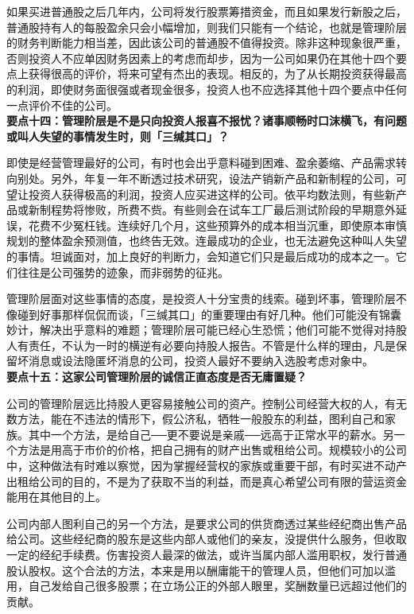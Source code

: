 \documentclass[UTF8,a4paper,zihao=-4,fontset = windows]{ctexart} %
\begin{document}
如果买进普通股之后几年内，公司将发行股票筹措资金，而且如果发行新股之后，普通股持有人的每股盈余只会小幅增加，则我们只能有一个结论，也就是管理阶层的财务判断能力相当差，因此该公司的普通股不值得投资。除非这种现象很严重，否则投资人不应单因财务因素上的考虑而却步，因为一公司如果仍在其他十四个要点上获得很高的评价，将来可望有杰出的表现。相反的，为了从长期投资获得最高的利润，即使财务面很强或者现金很多，投资人也不应选择其他十四个要点中任何一点评价不佳的公司。
\\

\textbf{要点十四：管理阶层是不是只向投资人报喜不报忧？诸事顺畅时口沫横飞，有问题或叫人失望的事情发生时，则「三缄其口」？}


即使是经营管理最好的公司，有时也会出乎意料碰到困难、盈余萎缩、产品需求转向别处。另外，年复一年不断透过技术研究，设法产销新产品和新制程的公司，可望让投资人获得极高的利润，投资人应买进这样的公司。依平均数法则，有些新产品或新制程势将惨败，所费不赀。有些则会在试车工厂最后测试阶段的早期意外延误，花费不少冤枉钱。连续好几个月，这些预算外的成本相当沉重，即使原本审慎规划的整体盈余预测值，也终告无效。连最成功的企业，也无法避免这种叫人失望的事情。坦诚面对，加上良好的判断力，会知道它们只是最后成功的成本之一。它们往往是公司强势的迹象，而非弱势的征兆。

管理阶层面对这些事情的态度，是投资人十分宝贵的线索。碰到坏事，管理阶层不像碰到好事那样侃侃而谈，「三缄其口」的重要理由有好几种。他们可能没有锦囊妙计，解决出乎意料的难题；管理阶层可能已经心生恐慌；他们可能不觉得对持股人有责任，不认为一时的横逆有必要向持股人报告。不管是什么样的理由，凡是保留坏消息或设法隐匿坏消息的公司，投资人最好不要纳入选股考虑对象中。
\\

\textbf{要点十五：这家公司管理阶层的诚信正直态度是否无庸置疑？}


公司的管理阶层远比持股人更容易接触公司的资产。控制公司经营大权的人，有无数方法，能在不违法的情形下，假公济私，牺牲一般股东的利益，图利自己和家族。其中一个方法，是给自己──更不要说是亲戚──远高于正常水平的薪水。另一个方法是用高于市价的价格，把自己拥有的财产出售或租给公司。规模较小的公司中，这种做法有时难以察觉，因为掌握经营权的家族或重要干部，有时买进不动产出租给公司的目的，不是为了获取不当的利益，而是真心希望公司有限的营运资金能用在其他目的上。

公司内部人图利自己的另一个方法，是要求公司的供货商透过某些经纪商出售产品给公司。这些经纪商的股东是这些内部人或他们的亲友，没提供什么服务，但收取一定的经纪手续费。伤害投资人最深的做法，或许当属内部人滥用职权，发行普通股认股权。这个合法的方法，本来是用以酬庸能干的管理人员，但他们可加以滥用，自己发给自己很多股票；在立场公正的外部人眼里，奖酬数量已远超过他们的贡献。
\end{document}
